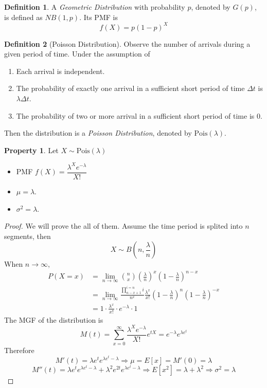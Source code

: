 \documentclass[12pt,a4paper,twoside]{article}
\theoremstyle{definition}
\newtheorem{definition}{Definition}[section]
\newtheorem{property}{Property}[section]
\theoremstyle{remark}
\begin{document}
    \begin{definition}%
        A \textit{Geometric Distribution} with probability $p$, denoted by $G(p)$, is defined as $NB(1, p)$. Its PMF is 
        \[ f(X) = p (1-p)^X \]
    \end{definition}
    \begin{definition}[Poisson Distribution]
        Observe the number of arrivals during a given period of time. Under the assumption of 
        \begin{enumerate}
            \item Each arrival is independent.
            \item The probability of exactly one arrival in a sufficient short period of time $\Delta t$ is $\lambda \Delta t$.
            \item The probability of two or more arrival in a sufficient short period of time is 0.
        \end{enumerate}
        Then the distribution is a \textit{Poisson Distribution}, denoted by $\text{Pois}(\lambda)$.
    \end{definition}
    \begin{property}
        Let $X \sim \text{Pois}(\lambda)$
        \begin{itemize}
            \item PMF $f(X) = \dfrac{\lambda^Xe^{-\lambda}}{X!}$
            \item $\mu = \lambda$.
            \item $\sigma^2 = \lambda$.
        \end{itemize}
    \end{property}
    \begin{proof}
        We will prove the all of them. 
        Assume the time period is splited into $n$ segments, then
        \[ X \sim B(n, \frac{\lambda}{n}) \]
        When $n \rightarrow \infty$,
        \begin{align*} 
        P(X = x) 
            & = \lim_{n \to \infty} \binom{n}{x} \left(\frac\lambda n\right)^x \left(1 - \frac\lambda n\right)^{n-x}  \\
            & = \lim_{n \to \infty} \frac{\prod^{i=n}_{n-x+1} i}{n^x} \frac{\lambda^x}{x!}\left(1 - \frac\lambda n\right)^n\left(1 - \frac\lambda n\right)^{-x} \\
            & = 1 \cdot \frac{\lambda^x}{x!} \cdot e^{-\lambda} \cdot 1
        \end{align*}
        The MGF of the distribution is
        \[ M(t) = \sum_{x=0}^{\infty} \dfrac{\lambda^Xe^{-\lambda}}{X!} e^{tX} = e^{-\lambda}e^{\lambda e^t} \]
        Therefore 
        \[ M'(t) = \lambda e^t e^{\lambda e^t - \lambda} \Rightarrow \mu = E[x] = M'(0) =\lambda \]
        \[ M''(t) = \lambda e^t e^{\lambda e^t - \lambda} + \lambda^2 e^{2t} e^{\lambda e^t - \lambda}\Rightarrow E[x^2] = \lambda + \lambda^2 \Rightarrow \sigma^2 = \lambda \]
    \end{proof}
    
\end{document}
